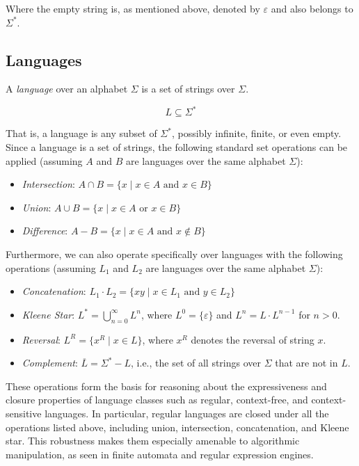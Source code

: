 Where the empty string is, as mentioned above, denoted by $\varepsilon$ and also belongs to $\Sigma^*$.

\subsection*{Languages}

A \emph{language} over an alphabet $\Sigma$ is a set of strings over $\Sigma$.

\[
L \subseteq \Sigma^*
\]

That is, a language is any subset of $\Sigma^*$, possibly infinite, finite, or even empty. \newline
Since a language is a set of strings, the following standard set operations can be applied (assuming $A$ and $B$ are languages over the same alphabet $\Sigma$):

\begin{itemize}
	\item \emph{Intersection}: $A \cap B = \{ x \mid x \in A \text{ and } x \in B \}$
	\item \emph{Union}: $A \cup B = \{ x \mid x \in A \text{ or } x \in B \}$
	\item \emph{Difference}: $A - B = \{ x \mid x \in A \text{ and } x \notin B \}$
\end{itemize}

Furthermore, we can also operate specifically over languages with the following operations (assuming $L_1$ and $L_2$ are languages over the same alphabet $\Sigma$):

\begin{itemize}
	\item \emph{Concatenation}: $L_1 \cdot L_2 = \{ xy \mid x \in L_1 \text{ and } y \in L_2 \}$
	\item \emph{Kleene Star}: $L^* = \bigcup_{n=0}^{\infty} L^n$, where $L^0 = \{\varepsilon\}$ and $L^n = L \cdot L^{n-1}$ for $n > 0$.
	\item \emph{Reversal}: $L^R = \{ x^R \mid x \in L \}$, where $x^R$ denotes the reversal of string $x$.
	\item \emph{Complement}: $\overline{L} = \Sigma^* - L$, i.e., the set of all strings over $\Sigma$ that are not in $L$.
\end{itemize}

These operations form the basis for reasoning about the expressiveness and closure properties of language classes such as regular, context-free, and context-sensitive languages. In particular, regular languages are closed under all the operations listed above, including union, intersection, concatenation, and Kleene star. This robustness makes them especially amenable to algorithmic manipulation, as seen in finite automata and regular expression engines.


